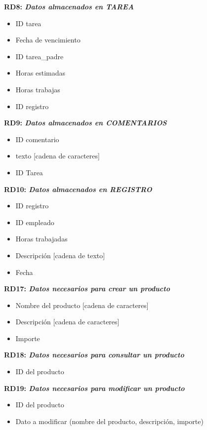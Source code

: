 \documentclass[paper=a4, fontsize=11pt, spanish]{scrartcl}
\begin{document}
	\setlength{\parindent}{0em}
	\textbf{RD8: \textit{Datos almacenados en TAREA}}
	\setlength{\parindent}{2em}
	\begin{itemize}
		\item ID tarea
		\item Fecha de vencimiento
		\item ID tarea\_padre
		\item Horas estimadas 
		\item Horas trabajas 
		\item ID registro
	\end{itemize}
	
	\setlength{\parindent}{0em}
	\textbf{RD9: \textit{Datos almacenados en COMENTARIOS}}
	\setlength{\parindent}{2em}
	\begin{itemize}
		\item ID comentario
		\item texto [cadena de caracteres]
		\item ID Tarea
	\end{itemize}
	
	\setlength{\parindent}{0em}
	\textbf{RD10: \textit{Datos almacenados en REGISTRO}}
	\setlength{\parindent}{2em}
	\begin{itemize}
		\item ID registro
		\item ID empleado
		\item Horas trabajadas
		\item Descripción [cadena de texto]
		\item Fecha
	\end{itemize}
	
	\setlength{\parindent}{0em}
	\textbf{RD17: \textit{Datos necesarios para crear un producto}}
	\setlength{\parindent}{2em}
	\begin{itemize}
		\item Nombre del producto [cadena de caracteres]
		\item Descripción [cadena de caracteres]
		\item Importe
	\end{itemize}
	
	\setlength{\parindent}{0em}
	\textbf{RD18: \textit{Datos necesarios para consultar un producto}}
	\setlength{\parindent}{2em}
	\begin{itemize}
		\item ID del producto
	\end{itemize}
	
	\setlength{\parindent}{0em}
	\textbf{RD19: \textit{Datos necesarios para modificar un producto}}
	\setlength{\parindent}{2em}
	\begin{itemize}
		\item ID del producto
		\item Dato a modificar (nombre del producto, descripción, importe)
	\end{itemize}
	
\end{document}
